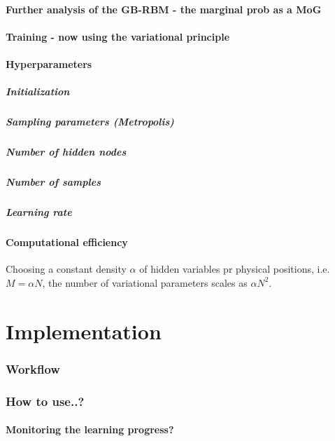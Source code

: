 \documentclass[twoside,english]{uiofysmaster}
\begin{document}
\subsection{Further analysis of the GB-RBM - the marginal prob as a MoG}
\subsection{Training - now using the variational principle}
\subsection{Hyperparameters}
\subsubsection{Initialization}
\subsubsection{Sampling parameters (Metropolis)}
\subsubsection{Number of hidden nodes}
\subsubsection{Number of samples}
\subsubsection{Learning rate}
\subsection{Computational efficiency}
Choosing a constant density $\alpha$ of hidden variables pr physical positions, i.e. $M=\alpha N$, the number of variational parameters scales as $\alpha N^2$.

\part{Implementation}
\section{Workflow}
\section{How to use..?}
\subsection{Monitoring the learning progress?}
\end{document}
